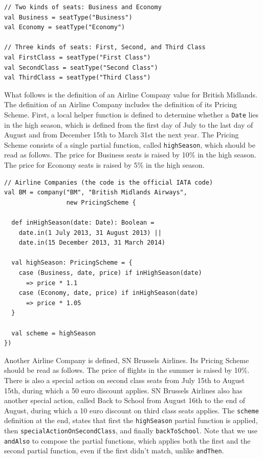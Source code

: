 \documentclass[a4paper]{article}
\newcommand{\cc}[1]{\texttt{#1}}
\renewcommand{\sc}[1]{\lstinline{#1}}
\begin{document}
\begin{lstlisting}
// Two kinds of seats: Business and Economy
val Business = seatType("Business")
val Economy = seatType("Economy")

// Three kinds of seats: First, Second, and Third Class
val FirstClass = seatType("First Class")
val SecondClass = seatType("Second Class")
val ThirdClass = seatType("Third Class")
\end{lstlisting}

What follows is the definition of an Airline Company value for British Midlands.
The definition of an Airline Company includes the definition of its Pricing Scheme.
First, a local helper function is defined to determine whether a \cc{Date} lies in the high season, which is defined from the first day of July to the last day of August and from December 15th to March 31st the next year.
The Pricing Scheme consists of a single partial function, called \cc{highSeason}, which should be read as follows.
The price for Business seats is raised by 10\% in the high season.
The price for Economy seats is raised by 5\% in the high season.

\begin{lstlisting}
// Airline Companies (the code is the official IATA code)
val BM = company("BM", "British Midlands Airways",
                 new PricingScheme {

  def inHighSeason(date: Date): Boolean =
    date.in(1 July 2013, 31 August 2013) ||
    date.in(15 December 2013, 31 March 2014)

  val highSeason: PricingScheme = {
    case (Business, date, price) if inHighSeason(date)
      => price * 1.1
    case (Economy, date, price) if inHighSeason(date)
      => price * 1.05
  }

  val scheme = highSeason
})
\end{lstlisting}

Another Airline Company is defined, SN Brussels Airlines.
Its Pricing Scheme should be read as follows.
The price of flights in the summer is raised by 10\%.
There is also a special action on second class seats from July 15th to August 15th, during which a 50 euro discount applies.
SN Brussels Airlines also has another special action, called Back to School from August 16th to the end of August, during which a 10 euro discount on third class seats applies.
The \sc{scheme} definition at the end, states that first the \cc{highSeason} partial function is applied, then \cc{special\-Action\-On\-Second\-Class}, and finally \cc{backToSchool}.
Note that we use \sc{andAlso} to compose the partial functions, which applies both the first and the second partial function, even if the first didn't match, unlike \sc{andThen}.
\end{document}
